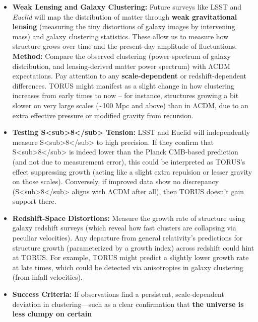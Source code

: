 \documentclass[]{article}
\begin{document}
\begin{itemize}
  \begin{itemize}
  \item
    \textbf{Weak Lensing and Galaxy Clustering:} Future surveys like
    LSST and \emph{Euclid} will map the distribution of matter through
    \textbf{weak gravitational lensing} (measuring the tiny distortions
    of galaxy images by intervening mass) and galaxy clustering
    statistics. These allow us to measure how structure grows over time
    and the present-day amplitude of fluctuations. \textbf{Method:}
    Compare the observed clustering (power spectrum of galaxy
    distribution, and lensing-derived matter power spectrum) with ΛCDM
    expectations. Pay attention to any \textbf{scale-dependent} or
    redshift-dependent differences. TORUS might manifest as a slight
    change in how clustering increases from early times to now -- for
    instance, structures growing a bit slower on very large scales
    (\textasciitilde{}100 Mpc and above) than in ΛCDM, due to an extra
    effective pressure or modified gravity from recursion.
  \item
    \textbf{Testing
    S\textless{}sub\textgreater{}8\textless{}/sub\textgreater{}
    Tension:} LSST and Euclid will independently measure
    S\textless{}sub\textgreater{}8\textless{}/sub\textgreater{} to high
    precision. If they confirm that
    S\textless{}sub\textgreater{}8\textless{}/sub\textgreater{} is
    indeed lower than the Planck CMB-based prediction (and not due to
    measurement error), this could be interpreted as TORUS's effect
    suppressing growth (acting like a slight extra repulsion or lesser
    gravity on those scales)​. Conversely, if improved data show no
    discrepancy
    (S\textless{}sub\textgreater{}8\textless{}/sub\textgreater{} aligns
    with ΛCDM after all), then TORUS doesn't gain support there.
  \item
    \textbf{Redshift-Space Distortions:} Measure the growth rate of
    structure using galaxy redshift surveys (which reveal how fast
    clusters are collapsing via peculiar velocities). Any departure from
    general relativity's predictions for structure growth (parameterized
    by a growth index) across redshift could hint at TORUS. For example,
    TORUS might predict a slightly lower growth rate at late times,
    which could be detected via anisotropies in galaxy clustering (from
    infall velocities).
  \item
    \textbf{Success Criteria:} If observations find a persistent,
    scale-dependent deviation in clustering---such as a clear
    confirmation that \textbf{the universe is less clumpy on certain
}
\end{itemize}
\end{itemize}
\end{document}
